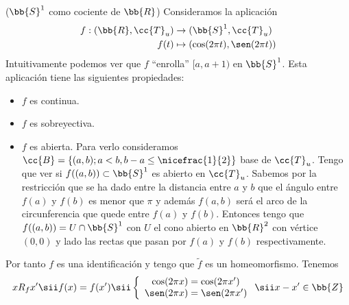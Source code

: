  \begin{ejemplo}($\bb{S}^1$ como cociente de $\bb{R}$)
    Consideramos la aplicación
    \begin{align*}
        f:(\bb{R}, \cc{T}_u)&\to (\bb{S}^1, \cc{T}_u)\\
        f(t) & \mapsto (\cos(2\pi t), \sen (2\pi t))
    \end{align*}
    Intuitivamente podemos ver que $f$ ``enrolla'' $[a,a+1)$ en $\bb{S}^1$.
    Esta aplicación tiene las siguientes propiedades:
    \begin{itemize}
        \item $f$ es continua.
        \item $f$ es sobreyectiva.
        \item $f$ es abierta. Para verlo consideramos $\cc{B}=\{(a,b); a<b, b-a \leq \nicefrac{1}{2}\}$ base de $\cc{T}_u$. Tengo que ver si $f((a,b))\subset \bb{S}^1$ es abierto en $\cc{T}_u$. Sabemos por la restricción que se ha dado entre la distancia entre $a$ y $b$ que el ángulo entre $f(a)$ y $f(b)$ es menor que $\pi$ y además $f(a,b)$ será el arco de la circunferencia que quede entre $f(a)$ y $f(b)$. Entonces tengo que $f((a,b)) = U\cap \bb{S}^1$ con $U$ el cono abierto en $\bb{R}^2$ con vértice $(0,0)$ y lado las rectas que pasan por $f(a)$ y $f(b)$ respectivamente.
    \end{itemize}

    Por tanto $f$ es una identificación y tengo que $\tilde{f}$ es un homeomorfismo. Tenemos 
    \begin{align*}
        xR_fx' \sii f(x)=f(x') \sii \left\{
        \begin{array}{c}
            \cos(2\pi x) = \cos(2\pi x')\\
            \sen(2\pi x) = \sen(2\pi x')
        \end{array}
        \right. \sii x-x'\in \bb{Z}
    \end{align*}
    \endsquare
 \end{ejemplo}

